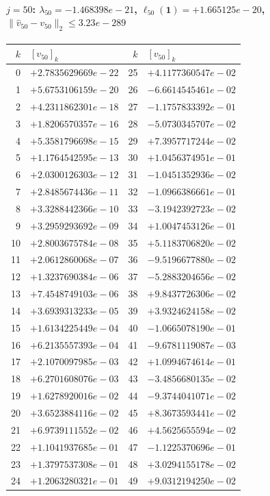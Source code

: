 \paragraph{$j = 50$: $\lambda_{50} = -1.468398e-21$, \quad $\ell_{50}(\mathbf{1}) = +1.665125e-20$, \quad $\|\hat{v}_{50} - v_{50}\|_2 \leq 3.23e-289$}
\begin{center}
{\footnotesize
\begin{tabular}{r@{\;\;}l@{\quad}r@{\;\;}l}
\toprule
$k$ & $[v_{50}]_k$ & $k$ & $[v_{50}]_k$ \\
\midrule
0 & $+2.7835629669e-22$ & 25 & $+4.1177360547e-02$ \\
1 & $+5.6753106159e-20$ & 26 & $-6.6614545461e-02$ \\
2 & $+4.2311862301e-18$ & 27 & $-1.1757833392e-01$ \\
3 & $+1.8206570357e-16$ & 28 & $-5.0730345707e-02$ \\
4 & $+5.3581796698e-15$ & 29 & $+7.3957717244e-02$ \\
5 & $+1.1764542595e-13$ & 30 & $+1.0456374951e-01$ \\
6 & $+2.0300126303e-12$ & 31 & $-1.0451352936e-02$ \\
7 & $+2.8485674436e-11$ & 32 & $-1.0966386661e-01$ \\
8 & $+3.3288442366e-10$ & 33 & $-3.1942392723e-02$ \\
9 & $+3.2959293692e-09$ & 34 & $+1.0047453126e-01$ \\
10 & $+2.8003675784e-08$ & 35 & $+5.1183706820e-02$ \\
11 & $+2.0612860068e-07$ & 36 & $-9.5196677880e-02$ \\
12 & $+1.3237690384e-06$ & 37 & $-5.2883204656e-02$ \\
13 & $+7.4548749103e-06$ & 38 & $+9.8437726306e-02$ \\
14 & $+3.6939313233e-05$ & 39 & $+3.9324624158e-02$ \\
15 & $+1.6134225449e-04$ & 40 & $-1.0665078190e-01$ \\
16 & $+6.2135557393e-04$ & 41 & $-9.6781119087e-03$ \\
17 & $+2.1070097985e-03$ & 42 & $+1.0994674614e-01$ \\
18 & $+6.2701608076e-03$ & 43 & $-3.4856680135e-02$ \\
19 & $+1.6278920016e-02$ & 44 & $-9.3744041071e-02$ \\
20 & $+3.6523884116e-02$ & 45 & $+8.3673593441e-02$ \\
21 & $+6.9739111552e-02$ & 46 & $+4.5625655594e-02$ \\
22 & $+1.1041937685e-01$ & 47 & $-1.1225370696e-01$ \\
23 & $+1.3797537308e-01$ & 48 & $+3.0294155178e-02$ \\
24 & $+1.2063280321e-01$ & 49 & $+9.0312194250e-02$ \\
\bottomrule
\end{tabular}
}
\end{center}

